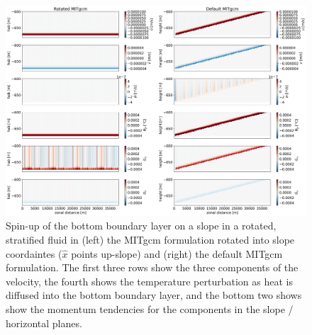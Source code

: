 \documentclass{article}
\begin{document}
\begin{figure}[htb!]
\noindent\includegraphics[width=1.0\textwidth]{rotated_bbl.png}
\centering
\caption{Spin-up of the bottom boundary layer on a slope in a rotated, stratified fluid in (left) the MITgcm formulation rotated into slope coordaintes ($\hat{x}$ points up-slope) and (right) the default MITgcm formulation. The first three rows show the three components of the velocity, the fourth shows the temperature perturbation as heat is diffused into the bottom boundary layer, and the bottom two shows show the momentum tendencies for the components in the slope / horizontal planes.}
\label{rotated_bbl}
\end{figure}



\end{document}
